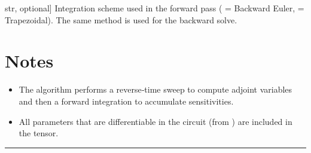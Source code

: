 \documentclass[letterpaper,10pt,english]{sphinxmanual}
\begin{document}
\begin{fulllineitems}
\begin{description}
\sphinxlineitem{method}{[}str, optional{]}
\sphinxAtStartPar
Integration scheme used in the forward pass ( = Backward Euler,
 = Trapezoidal).  The same method is used for the backward solve.

\end{description}


\section{Notes}
\label{\detokenize{adjoint_engine:notes}}\begin{itemize}
\item {} 
\sphinxAtStartPar
The algorithm performs a reverse‑time sweep to compute adjoint variables
and then a forward integration to accumulate sensitivities.

\item {} 
\sphinxAtStartPar
All parameters that are differentiable in the circuit (from
) are included in the tensor.

\end{itemize}

\end{fulllineitems}



\bigskip\hrule\bigskip
\end{document}
